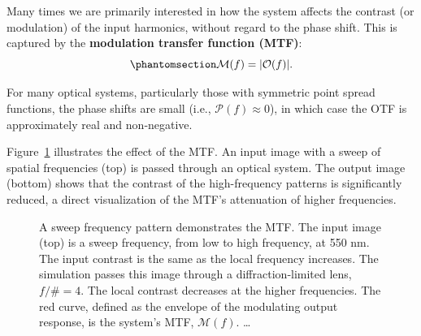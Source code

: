\documentclass[
  letterpaper,
]{book}
\begin{document}
Many times we are primarily interested in how the system affects the
contrast (or modulation) of the input harmonics, without regard to the
phase shift. This is captured by the \textbf{modulation transfer
function (MTF)}: \begin{equation}\phantomsection\label{eq-MTF-defined}{
\mathcal{M}(f) = |\mathcal{O}(f)|.
}\end{equation}

For many optical systems, particularly those with symmetric point spread
functions, the phase shifts are small (i.e.,
\(\mathcal{P}(f)\approx 0\)), in which case the OTF is approximately
real and non‑negative.

Figure~\ref{fig-optics-harmonics-mtf} illustrates the effect of the MTF.
An input image with a sweep of spatial frequencies (top) is passed
through an optical system. The output image (bottom) shows that the
contrast of the high-frequency patterns is significantly reduced, a
direct visualization of the MTF's attenuation of higher frequencies.

\begin{figure}


\caption{\label{fig-optics-harmonics-mtf}A sweep frequency pattern
demonstrates the MTF. The input image (top) is a sweep frequency, from
low to high frequency, at 550 nm. The input contrast is the same as the
local frequency increases. The simulation passes this image through a
diffraction‑limited lens, \(f/\#=4\). The local contrast decreases at
the higher frequencies. The red curve, defined as the envelope of the
modulating output response, is the system's MTF, \(\mathcal{M}(f)\).
\ldots{}}

\end{figure}%
\end{document}
